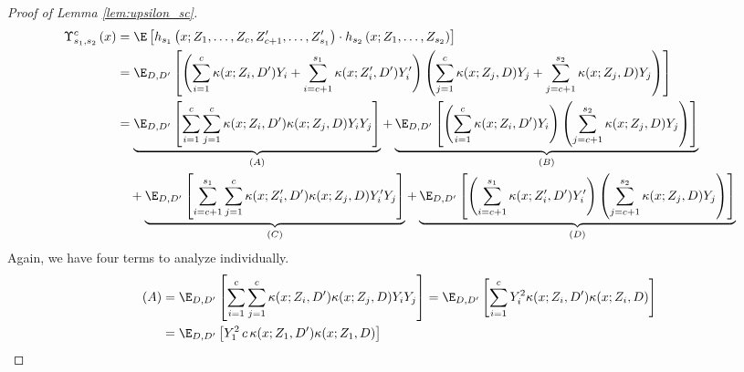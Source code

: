 \begin{proof}[Proof of Lemma \ref{lem:upsilon_sc}]
	\begin{equation}
		\begin{aligned}
			\Upsilon_{s_1, s_2}^{c}\left(x\right)
			 & = \E\left[h_{s_1}\left(x; Z_1, \ldots, Z_c, Z^{\prime}_{c+1}, \ldots,  Z^{\prime}_{s_1}\right) \cdot
			h_{s_2}\left(x; Z_1, \ldots, Z_{s_2}\right)\right]                                                                                                                       \\
			 & = \E_{D, D^{\prime}}\left[
				\left(\sum_{i = 1}^{c} \kappa(x; Z_{i}, D^{\prime})Y_{i} + \sum_{i = c+1}^{s_1} \kappa(x; Z_{i}^{\prime}, D^{\prime})Y_{i}^{\prime}\right)
				\left(\sum_{j = 1}^{c} \kappa(x; Z_j, D)Y_j + \sum_{j = c+1}^{s_2}\kappa(x; Z_j, D)Y_j \right)
			\right]                                                                                                                                                                                             \\
			 & = \underbrace{\E_{D, D^{\prime}}\left[\sum_{i = 1}^{c}\sum_{j = 1}^{c} \kappa(x; Z_{i}, D^{\prime})\kappa(x; Z_j, D)Y_{i} Y_j\right]}_{(A)}
			+ \underbrace{\E_{D, D^{\prime}}\left[\left(\sum_{i = 1}^{c}\kappa(x; Z_{i}, D^{\prime}) Y_{i}\right) \left(\sum_{j = c+1}^{s_2} \kappa(x; Z_j, D) Y_j\right)\right]}_{(B)} \\
			 & \quad + \underbrace{\E_{D, D^{\prime}}\left[\sum_{i = c+1}^{s_1}\sum_{j = 1}^{c} \kappa(x; Z_{i}^{\prime}, D^{\prime})\kappa(x; Z_j, D)Y_{i}^{\prime} Y_j\right]}_{(C)}
			+ \underbrace{\E_{D, D^{\prime}}\left[\left(\sum_{i = c+1}^{s_1}\kappa(x; Z_{i}^{\prime}, D^{\prime}) Y_{i}^{\prime}\right)
					\left(\sum_{j = c+1}^{s_2} \kappa(x; Z_j, D) Y_j\right)\right]}_{(D)}
		\end{aligned}
	\end{equation}
	Again, we have four terms to analyze individually.
	\begin{equation}
		\begin{aligned}
			(A)
			 & = \E_{D, D^{\prime}}\left[\sum_{i = 1}^{c}\sum_{j = 1}^{c} \kappa(x; Z_{i}, D^{\prime})\kappa(x; Z_j, D)Y_{i} Y_j\right]
			= \E_{D, D^{\prime}}\left[\sum_{i = 1}^{c} Y_{i}^2 \kappa(x; Z_{i}, D^{\prime})\kappa(x; Z_{i}, D)\right]                                                                          \\
			 & = \E_{D, D^{\prime}}\left[Y_{1}^2 \, c \, \kappa(x; Z_1, D^{\prime})\kappa(x; Z_1, D)\right]

\end{aligned}
\end{equation}
\end{proof}
